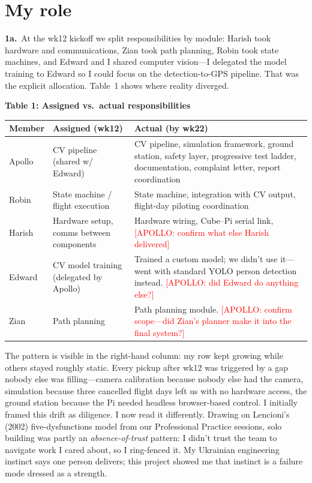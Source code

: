 \section{My role}

\textbf{1a.}~At the wk12 kickoff we split responsibilities by module: Harish took hardware and communications, Zian took path planning, Robin took state machines, and Edward and I shared computer vision---I delegated the model training to Edward so I could focus on the detection-to-GPS pipeline. That was the explicit allocation. Table~1 shows where reality diverged.

\vspace{0.3em}
{\small
\noindent\textbf{Table 1: Assigned vs.\ actual responsibilities}

\begin{tabularx}{\textwidth}{@{}l L L@{}}
\toprule
\textbf{Member} & \textbf{Assigned (wk12)} & \textbf{Actual (by wk22)} \\
\midrule
Apollo & CV pipeline (shared w/ Edward) & CV pipeline, simulation framework, ground station, safety layer, progressive test ladder, documentation, complaint letter, report coordination \\
Robin & State machine / flight execution & State machine, integration with CV output, flight-day piloting coordination \\
Harish & Hardware setup, comms between components & Hardware wiring, Cube--Pi serial link, \textcolor{red}{[APOLLO: confirm what else Harish delivered]} \\
Edward & CV model training (delegated by Apollo) & Trained a custom model; we didn't use it---went with standard YOLO person detection instead. \textcolor{red}{[APOLLO: did Edward do anything else?]} \\
Zian & Path planning & Path planning module. \textcolor{red}{[APOLLO: confirm scope---did Zian's planner make it into the final system?]} \\
\bottomrule
\end{tabularx}
}
\vspace{0.3em}

The pattern is visible in the right-hand column: my row kept growing while others stayed roughly static. Every pickup after wk12 was triggered by a gap nobody else was filling---camera calibration because nobody else had the camera, simulation because three cancelled flight days left us with no hardware access, the ground station because the Pi needed headless browser-based control. I initially framed this drift as diligence. I now read it differently. Drawing on Lencioni's (2002) five-dysfunctions model from our Professional Practice sessions, solo building was partly an \emph{absence-of-trust} pattern: I didn't trust the team to navigate work I cared about, so I ring-fenced it. My Ukrainian engineering instinct says one person delivers; this project showed me that instinct is a failure mode dressed as a strength.

